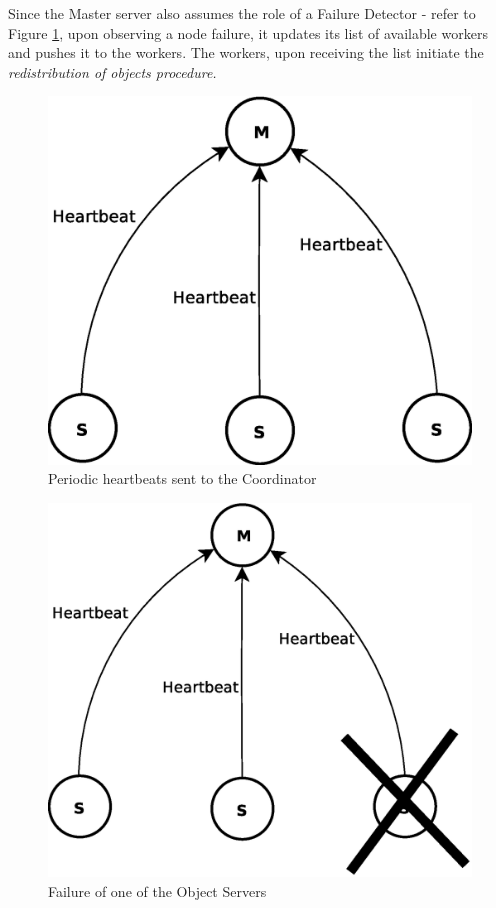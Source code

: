 \documentclass[times, 10pt,twocolumn]{article}
\begin{document}
\label{subsec:grmemb}
Since the Master server also assumes the role of a Failure Detector - refer to Figure \ref{fig:heart},
 upon observing a node failure, it updates its list of available workers and pushes it to the workers.
 The workers, upon receiving the list initiate the \it{redistribution} of objects procedure. 

\begin{figure}
\centering
\includegraphics[scale=0.3]{heartbeat.eps}
\caption{Periodic heartbeats sent to the Coordinator}
\label{fig:heart}
\end{figure}

\begin{figure}
\centering
\includegraphics[scale=0.3]{failure.eps}
\caption{Failure of one of the Object Servers}
\label{fig:fail}
\end{figure}
\end{document}
